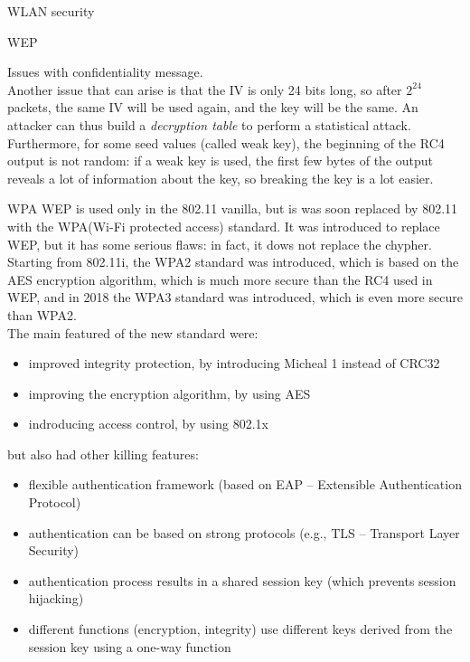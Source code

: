 \begin{section}{WLAN security}
\begin{subsection}{WEP}
\begin{subsubsection}{Issues with confidentiality}
      message.\\
      Another issue that can arise is that the IV is only 24 bits long, so after $2^{24}$ packets,
      the same IV will be used again, and the key will be the same. An attacker can thus build a 
      \textit{decryption table} to perform a statistical attack.\\
      Furthermore, for some seed values (called weak key), the beginning of the RC4 output is
      not random: if a weak key is used, the first few bytes of the output reveals a lot of 
      information about the key, so breaking the key is a lot easier.
    \end{subsubsection}
  \end{subsection}
  
  \begin{subsection}{WPA}
    WEP is used only in the 802.11 vanilla, but is was soon replaced by 802.11 with the WPA(Wi-Fi
    protected access) standard. It was introduced to replace WEP, but it has some serious flaws:
    in fact, it dows not replace the chypher.\\
    Starting from 802.11i, the WPA2 standard was introduced, which is based on the AES encryption
    algorithm, which is much more secure than the RC4 used in WEP, and in 2018 the WPA3 standard
    was introduced, which is even more secure than WPA2.\\
    The main featured of the new standard were:
    \begin{itemize}
      \item improved integrity protection, by introducing Micheal 1 instead of CRC32
      \item improving the encryption algorithm, by using AES
      \item indroducing access control, by using 802.1x
    \end{itemize}
    but also had other killing features:
    \begin{itemize}
      \item flexible authentication framework (based on EAP – Extensible Authentication Protocol)
      \item authentication can be based on strong protocols (e.g., TLS – Transport Layer Security)
      \item authentication process results in a shared session key (which prevents session hijacking)
      \item different functions (encryption, integrity) use different keys derived from the session key using a
        one-way function
    \end{itemize}
    

\end{subsection}
\end{section}
